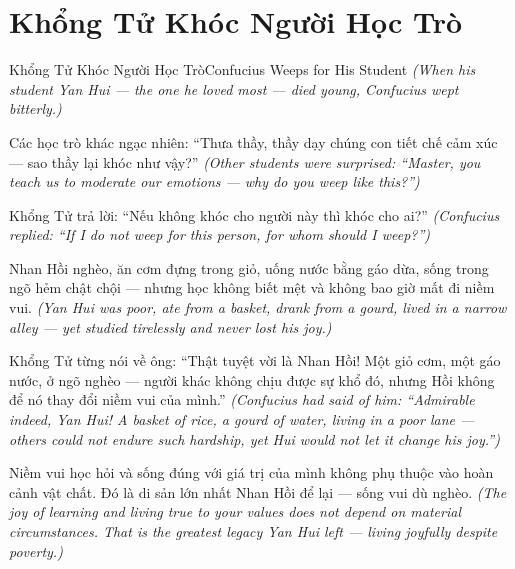 \section{Khổng Tử Khóc Người Học Trò}
\begin{truyen}{Khổng Tử Khóc Người Học Trò}{Confucius Weeps for His Student}
\textit{(When his student Yan Hui — the one he loved most — died young, Confucius wept bitterly.)}

Các học trò khác ngạc nhiên: ``Thưa thầy, thầy dạy chúng con tiết chế cảm xúc — sao thầy lại khóc như vậy?''
\textit{(Other students were surprised: ``Master, you teach us to moderate our emotions — why do you weep like this?'')}

Khổng Tử trả lời: ``Nếu không khóc cho người này thì khóc cho ai?''
\textit{(Confucius replied: ``If I do not weep for this person, for whom should I weep?'')}

Nhan Hồi nghèo, ăn cơm đựng trong giỏ, uống nước bằng gáo dừa, sống trong ngõ hẻm chật chội — nhưng học không biết mệt và không bao giờ mất đi niềm vui.
\textit{(Yan Hui was poor, ate from a basket, drank from a gourd, lived in a narrow alley — yet studied tirelessly and never lost his joy.)}

Khổng Tử từng nói về ông: ``Thật tuyệt vời là Nhan Hồi! Một giỏ cơm, một gáo nước, ở ngõ nghèo — người khác không chịu được sự khổ đó, nhưng Hồi không để nó thay đổi niềm vui của mình.''
\textit{(Confucius had said of him: ``Admirable indeed, Yan Hui! A basket of rice, a gourd of water, living in a poor lane — others could not endure such hardship, yet Hui would not let it change his joy.'')}

\end{truyen}

\begin{baihoc}
Niềm vui học hỏi và sống đúng với giá trị của mình không phụ thuộc vào hoàn cảnh vật chất. Đó là di sản lớn nhất Nhan Hồi để lại — sống vui dù nghèo.
\textit{(The joy of learning and living true to your values does not depend on material circumstances. That is the greatest legacy Yan Hui left — living joyfully despite poverty.)}
\end{baihoc}
\ngancach

